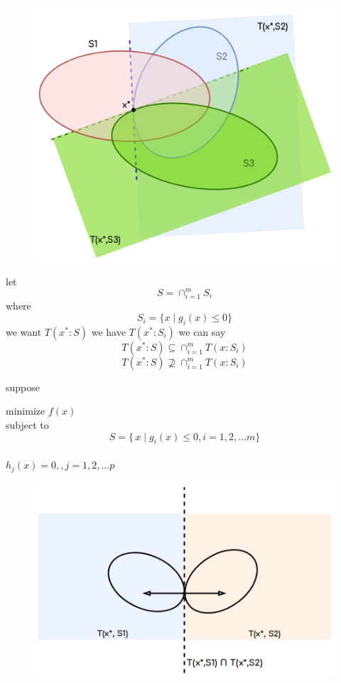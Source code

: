 \documentclass[twoside]{article}
\begin{document}
\begin{figure}[h]
\center
\includegraphics[scale=0.25]{images/pic5.png}
\end{figure}
let $$S = \cap^{m}_{i=1}S_i$$ where $$S_i = \{ x\mid g_i(x)\leq 0\}$$
we want $T(x^*:S)$ we have $T(x^*:S_i)$
we can say $$T(x^*:S) \subseteq \cap_{i=1}^{m}T(x:S_i)$$
$$T(x^*:S)\nsupseteq \cap_{i=1}^{m}T(x:S_i)$$

suppose 
\begin{center}
minimize $f(x)$\\
subject to $$S = \{\,x\mid g_{i}(x)\leq 0 , i = 1,2,...m\}$$\\
$h_j(x) = 0, , j = 1,2,...p$
\end{center}

\begin{figure}[h]
\center
\includegraphics[scale=0.25]{images/pic6.png}
\end{figure}
\end{document}
